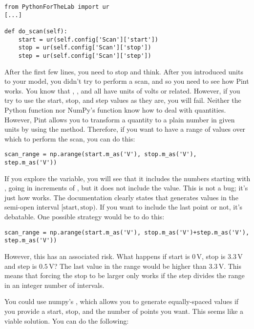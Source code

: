\begin{verbatim}
from PythonForTheLab import ur
[...]

def do_scan(self):
    start = ur(self.config['Scan']['start'])
    stop = ur(self.config['Scan']['stop'])
    step = ur(self.config['Scan']['step'])
\end{verbatim}

After the first few lines, you need to stop and think. After you introduced units to your model, you didn't try to perform a scan, and so you need to see how Pint works. You know that , , and  all have units of volts or related. However, if you try to use the start, stop, and step values as they are, you will fail. Neither the Python  function nor NumPy's  function know how to deal with quantities. However, Pint allows you to transform a quantity to a plain number in given units by using the  method. Therefore, if you want to have a range of values over which to perform the scan, you can do this:

\begin{verbatim}
scan_range = np.arange(start.m_as('V'), stop.m_as('V'), step.m_as('V'))
\end{verbatim}

If you explore the  variable, you will see that it includes the numbers starting with , going in increments of , but it does not include the  value. This is not a bug; it's just how  works. The documentation clearly states that  generates values in the semi-open interval $[\textrm{start}, \textrm{stop})$. If you want to include the last point or not, it's debatable. One possible strategy would be to do this:

\begin{verbatim}
scan_range = np.arange(start.m_as('V'), stop.m_as('V')+step.m_as('V'), step.m_as('V'))
\end{verbatim}

However, this has an associated risk. What happens if start is $0\,\textrm{V}$, stop is $3.3\,\textrm{V}$ and step is $0.5\,\textrm{V}$? The last value in the range would be higher than $3.3\,\textrm{V}$. This means that forcing the stop to be larger only works if the step divides the range in an integer number of intervals.

You could use numpy's , which allows you to generate equally-spaced values if you provide a start, stop, and the number of points you want. This seems like a viable solution. You can do the following:

